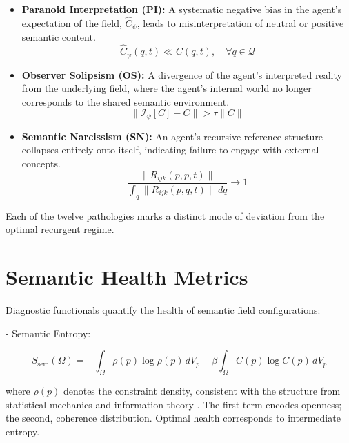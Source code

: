 \begin{itemize}
    \item \textbf{Paranoid Interpretation (PI):} A systematic negative bias in the agent's expectation of the field, \(\hat{C}_{\psi}\), leads to misinterpretation of neutral or positive semantic content.
    \begin{equation}
    \hat{C}_{\psi}(q,t) \ll C(q,t), \quad \forall q \in \mathcal{Q}
    \end{equation}

    \item \textbf{Observer Solipsism (OS):} A divergence of the agent's interpreted reality from the underlying field, where the agent's internal world no longer corresponds to the shared semantic environment.
    \begin{equation}
    \|\mathcal{I}_{\psi}[C] - C\| > \tau \|C\|
    \end{equation}

    \item \textbf{Semantic Narcissism (SN):} An agent's recursive reference structure collapses entirely onto itself, indicating failure to engage with external concepts.
    \begin{equation}
    \frac{\|R_{ijk}(p,p,t)\|}{\int_q \|R_{ijk}(p,q,t)\| \, dq} \to 1
    \end{equation}
\end{itemize}

Each of the twelve pathologies marks a distinct mode of deviation from the optimal recurgent regime.

\section{Semantic Health Metrics}

Diagnostic functionals quantify the health of semantic field configurations:

- Semantic Entropy:

\begin{equation}
S_{\text{sem}}(\Omega) = -\int_{\Omega} \rho(p) \log\rho(p) \, dV_p - \beta \int_{\Omega} C(p) \log C(p) \, dV_p
\end{equation}

where $\rho(p)$ denotes the constraint density, consistent with the structure from statistical mechanics and information theory \autocite{Shannon1948, CoverThomas2006, Reif1965, PathriaBeale2011}. The first term encodes openness; the second, coherence distribution. Optimal health corresponds to intermediate entropy.


